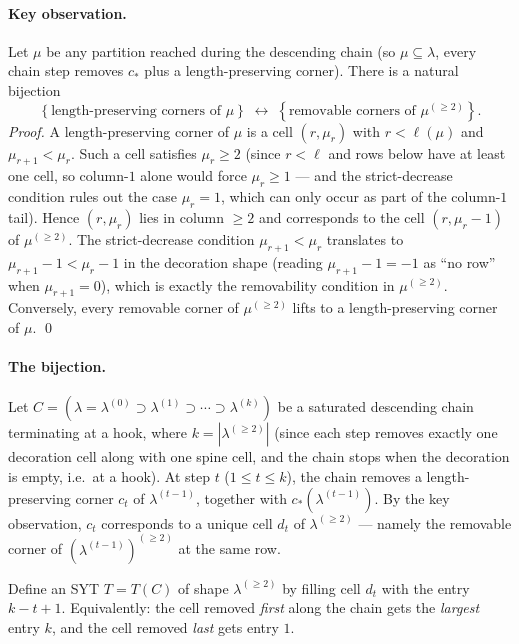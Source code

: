 \documentclass[11pt]{article}
\theoremstyle{definition}
\begin{document}
\paragraph{Key observation.}
Let $\mu$ be any partition reached during the descending chain (so
$\mu \subseteq \lambda$, every chain step removes $c_*$ plus a
length-preserving corner). There is a natural bijection
\[
   \left\{\text{length-preserving corners of }\mu\right\}
   \;\longleftrightarrow\;
   \left\{\text{removable corners of }\mu^{(\ge 2)}\right\}.
\]
\emph{Proof.} A length-preserving corner of $\mu$ is a cell
$(r, \mu_r)$ with $r < \ell(\mu)$ and $\mu_{r+1} < \mu_r$. Such a cell
satisfies $\mu_r \ge 2$ (since $r < \ell$ and rows below have at least
one cell, so column-$1$ alone would force $\mu_r \ge 1$ — and the
strict-decrease condition rules out the case $\mu_r = 1$, which can
only occur as part of the column-$1$ tail). Hence $(r, \mu_r)$ lies in
column $\ge 2$ and corresponds to the cell $(r, \mu_r - 1)$ of
$\mu^{(\ge 2)}$. The strict-decrease condition $\mu_{r+1} < \mu_r$
translates to $\mu_{r+1} - 1 < \mu_r - 1$ in the decoration shape
(reading $\mu_{r+1} - 1 = -1$ as ``no row'' when $\mu_{r+1} = 0$), which
is exactly the removability condition in $\mu^{(\ge 2)}$.
Conversely, every removable corner of $\mu^{(\ge 2)}$ lifts to a
length-preserving corner of $\mu$. \qed

\paragraph{The bijection.}
Let $C = (\lambda = \lambda^{(0)} \supset \lambda^{(1)} \supset \cdots
\supset \lambda^{(k)})$ be a saturated descending chain terminating at
a hook, where $k = |\lambda^{(\ge 2)}|$ (since each step removes exactly
one decoration cell along with one spine cell, and the chain stops when
the decoration is empty, i.e.\ at a hook). At step $t$
($1 \le t \le k$), the chain removes a length-preserving corner $c_t$
of $\lambda^{(t-1)}$, together with $c_*(\lambda^{(t-1)})$. By the key
observation, $c_t$ corresponds to a unique cell $d_t$ of
$\lambda^{(\ge 2)}$ — namely the removable corner of
$(\lambda^{(t-1)})^{(\ge 2)}$ at the same row.

Define an SYT $T = T(C)$ of shape $\lambda^{(\ge 2)}$ by filling cell
$d_t$ with the entry $k - t + 1$. Equivalently: the cell removed
\emph{first} along the chain gets the \emph{largest} entry $k$, and the
cell removed \emph{last} gets entry $1$.
\end{document}
